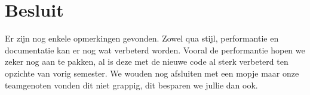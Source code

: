 \documentclass[a4paper,11pt]{article}
\begin{document}
    \section{Besluit}
    Er zijn nog enkele opmerkingen gevonden. Zowel qua stijl, performantie en documentatie kan er nog wat verbeterd worden. Vooral de performantie hopen we zeker nog aan te pakken, al is deze met de nieuwe code al sterk verbeterd ten opzichte van vorig semester. We wouden nog afsluiten met een mopje maar onze teamgenoten vonden dit niet grappig, dit besparen we jullie dan ook.

    
\end{document}
